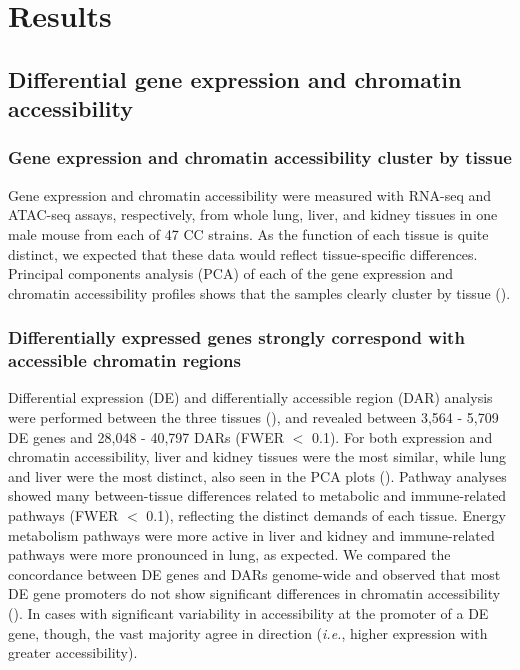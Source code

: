 \documentclass[10pt,letterpaper]{article}
\newcommand{\ie}{\emph{i.e.}\xspace}
\begin{document}
\section*{Results}
\subsection*{Differential gene expression and chromatin accessibility}

\subsubsection*{Gene expression and chromatin accessibility cluster by tissue}
Gene expression and chromatin accessibility were measured with RNA-seq and ATAC-seq assays, respectively, from whole lung, liver, and kidney tissues in one male mouse from each of 47 CC strains. As the function of each tissue is quite distinct, we expected that these data would reflect tissue-specific differences. Principal components analysis (PCA) of each of the gene expression and chromatin accessibility profiles shows that the samples clearly cluster by tissue (). 

\subsubsection*{Differentially expressed genes strongly correspond with accessible chromatin regions} 
Differential expression (DE) and differentially accessible region (DAR) analysis were performed between the three tissues (), and revealed between 3,564 - 5,709 DE genes and 28,048 - 40,797 DARs (FWER $<$ 0.1). For both expression and chromatin accessibility, liver and kidney tissues were the most similar, while lung and liver were the most distinct, also seen in the PCA plots (). Pathway analyses showed many between-tissue differences related to metabolic and immune-related pathways (FWER $<$ 0.1), reflecting the distinct demands of each tissue. Energy metabolism pathways were more active in liver and kidney and immune-related pathways were more pronounced in lung, as expected. We compared the concordance between DE genes and DARs genome-wide and observed that most DE gene promoters do not show significant differences in chromatin accessibility (). In cases with significant variability in accessibility at the promoter of a DE gene, though, the vast majority agree in direction (\ie, higher expression with greater accessibility).
\end{document}
